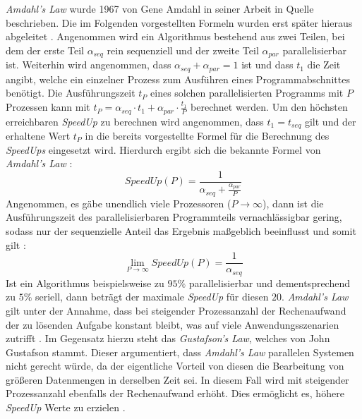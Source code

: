 \\\\
\emph{Amdahl's Law} wurde 1967 von Gene Amdahl in seiner Arbeit in Quelle \cite{amdahll1967validity} beschrieben. Die im Folgenden vorgestellten Formeln wurden erst später hieraus abgeleitet \cite{amdahll1967validity}. Angenommen wird ein Algorithmus bestehend aus zwei Teilen, bei dem der erste Teil $\alpha_{seq}$ rein sequenziell und der zweite Teil $\alpha_{par}$ parallelisierbar ist. Weiterhin wird angenommen, dass $\alpha_{seq}+\alpha_{par}=1$ ist und dass $t_1$ die Zeit angibt, welche ein einzelner Prozess zum Ausführen eines Programmabschnittes benötigt. Die Ausführungszeit $t_P$ eines solchen parallelisierten Programms mit $P$ Prozessen kann mit $t_P=\alpha_{seq} \cdot t_1 + \alpha_{par} \cdot \frac{t_1}{P}$ berechnet werden. Um den höchsten erreichbaren \emph{SpeedUp} zu berechnen wird angenommen, dass $t_1=t_{seq}$ gilt und der erhaltene Wert $t_P$ in die bereits vorgestellte Formel für die Berechnung des \emph{SpeedUps} eingesetzt wird. Hierdurch ergibt sich die bekannte Formel von \emph{Amdahl's Law} \cite{nielsen2016introduction}: 
$$SpeedUp(P)=\frac{1}{\alpha_{seq}+\frac{\alpha_{par}}{P}}$$
Angenommen, es gäbe unendlich viele Prozessoren ($P \rightarrow \infty$), dann ist die Ausführungszeit des parallelisierbaren Programmteils vernachlässigbar gering, sodass nur der sequenzielle Anteil das Ergebnis maßgeblich beeinflusst und somit gilt \cite{nielsen2016introduction}:
$$\lim _{P \rightarrow \infty} SpeedUp(P)=\frac{1}{\alpha_{seq}}$$
Ist ein Algorithmus beispielsweise zu $95\%$ parallelisierbar und dementsprechend zu $5\%$ seriell, dann beträgt der maximale \emph{SpeedUp} für diesen $20$. \emph{Amdahl's Law} gilt unter der Annahme, dass bei steigender Prozessanzahl der Rechenaufwand der zu lösenden Aufgabe konstant bleibt, was auf viele Anwendungsszenarien zutrifft \cite{nielsen2016introduction}. Im Gegensatz hierzu steht das \emph{Gustafson's Law}, welches von John Gustafson stammt. Dieser argumentiert, dass \emph{Amdahl's Law} parallelen Systemen nicht gerecht würde, da der eigentliche Vorteil von diesen die Bearbeitung von größeren Datenmengen in derselben Zeit sei. In diesem Fall wird mit steigender Prozessanzahl ebenfalls der Rechenaufwand erhöht. Dies ermöglicht es, höhere \emph{SpeedUp} Werte zu erzielen \cite{hill2008amdahl}.



















